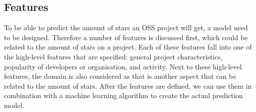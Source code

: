    
    \subsection{Features}
    To be able to predict the amount of stars an OSS project will get, a model need to be designed.
    Therefore a number of features is discussed first, which could be related to the amount of stars on a project.
    Each of these features fall into one of the high-level features that are specified: general project characteristics, popularity of developers or organisation, and activity.
    Next to these high-level features, the domain is also considered as that is another aspect that can be related to the amount of stars.
    After the features are defined, we can use them in combination with a machine learning algorithm to create the actual prediction model.\\

